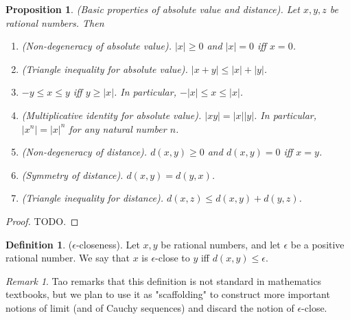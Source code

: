 \documentclass[12pt]{article}
\newtheorem{proposition}[theorem]{Proposition}
\theoremstyle{definition}
\newtheorem{definition}[theorem]{Definition}
\theoremstyle{remark}
\newtheorem*{remark}{Remark}
\begin{document}
\begin{proposition}
    (Basic properties of absolute value and distance). Let $x, y, z$ be rational numbers. Then
    \begin{enumerate}
        \item (Non-degeneracy of absolute value). $|x| \geq 0$ and $|x| = 0$ iff $x = 0$.
        \item (Triangle inequality for absolute value). $|x+y| \leq |x| + |y|$.
        \item $-y \leq x \leq y$ iff $y \geq |x|$. In particular, $-|x| \leq x \leq |x|$.
        \item (Multiplicative identity for absolute value). $|xy| = |x||y|$. In particular, $|x^n| = |x|^n$ for any natural number $n$.
        \item (Non-degeneracy of distance). $d(x,y) \geq 0$ and $d(x,y) = 0$ iff $x = y$.
        \item (Symmetry of distance). $d(x,y) = d(y,x)$.
        \item (Triangle inequality for distance). $d(x,z) \leq d(x,y) + d(y,z)$.
    \end{enumerate}
\end{proposition}

\begin{proof}
    TODO.
\end{proof}

\begin{definition}
    ($\epsilon$-closeness). Let $x, y$ be rational numbers, and let $\epsilon$ be a positive rational number. We say that $x$ is $\epsilon$-close to $y$ iff $d(x,y) \leq \epsilon$.
\end{definition}

\begin{remark}
    Tao remarks that this definition is not standard in mathematics textbooks, but we plan to use it as "scaffolding" to construct more important notions of limit (and of Cauchy sequences) and discard the notion of $\epsilon$-close.
\end{remark}
\end{document}
